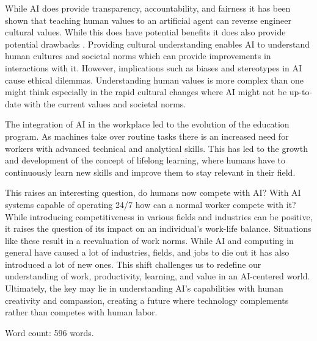 \documentclass[12pt]{article}
\begin{document}
{While AI does provide transparency, accountability, and fairness it has been shown that teaching human values to an artificial agent can reverse engineer cultural values. While this does have potential benefits it does also provide potential drawbacks \cite{riedl2015using}. Providing cultural understanding enables AI to understand human cultures and societal norms which can provide improvements in interactions with it. However, implications such as biases and stereotypes in AI cause ethical dilemmas. Understanding human values is more complex than one might think especially in the rapid cultural changes where AI might not be up-to-date with the current values and societal norms.

The integration of AI in the workplace led to the evolution of the education program. As machines take over routine tasks there is an increased need for workers with advanced technical and analytical skills. This has led to the growth and development of the concept of lifelong learning, where humans have to continuously learn new skills and improve them to stay relevant in their field.

This raises an interesting question, do humans now compete with AI? With AI systems capable of operating 24/7 how can a normal worker compete with it? While introducing competitiveness in various fields and industries can be positive, it raises the question of its impact on an individual's work-life balance. Situations like these result in a reevaluation of work norms. While AI and computing in general have caused a lot of industries, fields, and jobs to die out it has also introduced a lot of new ones. This shift challenges us to redefine our understanding of work, productivity, learning, and value in an AI-centered world. Ultimately, the key may lie in understanding AI's capabilities with human creativity and compassion, creating a future where technology complements rather than competes with human labor.

Word count: 596 words.

}

\printbibliography[title={References - Casper}, category=casper]
\end{document}
